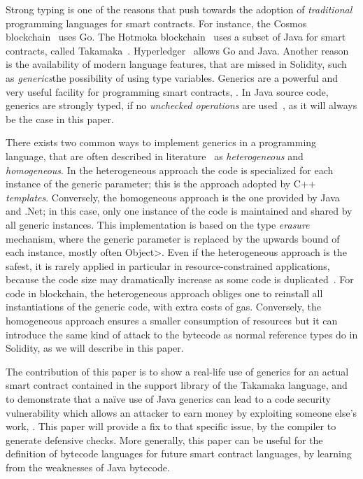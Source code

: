 Strong typing is one of the reasons that push towards the adoption
of \emph{traditional} programming languages for smart contracts. For instance,
the Cosmos blockchain~\cite{cosmos} uses Go. The
Hotmoka blockchain~\cite{hotmoka} uses a subset of Java
for smart contracts, called Takamaka~\cite{Spoto19,Spoto20}.
Hyperledger~\cite{hyperldeger} allows Go and Java.
Another reason is the availability of modern
language features, that are missed in Solidity,
such as \emph{generics}\ie the possibility of using
type variables. Generics are a powerful and very useful facility for programming
smart contracts, . In Java source code, generics are strongly typed, if no \emph{unchecked operations}
are used~\cite{NaftalinW06}, as it will always be the case in this paper.



There exists two common ways to implement generics in a programming language,
that are often described in literature~\cite{generics_categories} as \emph{heterogeneous}
and \emph{homogeneous}. In the heterogeneous approach the code is specialized for each instance
of the generic parameter; this is the approach adopted by C++ \emph{templates}.
Conversely, the homogeneous approach is the one provided by Java and .Net; in this case,
only one instance of the code is maintained and shared by all generic instances.
This implementation is based on the type \emph{erasure} mechanism, where the generic parameter
is replaced by the upwards bound of each instance, mostly often \<Object>.
Even if the heterogeneous approach is the safest, it is rarely applied in particular
in resource-constrained applications, because the code size may dramatically increase
as some code is duplicated~\cite{generics_embedded_systems}. For code in blockchain,
the heterogeneous approach obliges one to reinstall all instantiations of the generic code,
with extra costs of gas.
Conversely, the homogeneous approach ensures a smaller consumption
of resources but it can introduce the same kind of attack to the bytecode
as normal reference types do in Solidity, as we will describe in this paper.

The contribution of this paper is to show a real-life
use of generics for an actual smart contract contained in the support
library of the Takamaka language, and to demonstrate that a na\"{i}ve use
of Java generics can lead to a code security vulnerability which
allows an attacker to earn money by exploiting someone else's work, .
This paper will provide a fix to that specific issue,
by  the compiler to generate defensive checks.
More generally, this paper can be useful for the definition of
bytecode languages for future smart contract languages, by
learning from the weaknesses of Java bytecode.

